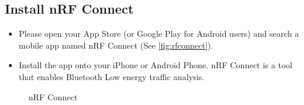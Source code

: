 \documentclass[11pt]{article}
\begin{document}
\begin{enumerate}
\subsection{Install \textsf{nRF Connect}}
\begin{itemize}
\item  Please open your App Store (or Google Play for Android users) and search a mobile app named \textsf{nRF Connect} (See \autoref{fig:rfconnect}). 
\item Install the app onto your iPhone or Android Phone. \textsf{nRF Connect} is a tool that enables Bluetooth Low energy traffic analysis.  
\end{itemize}

 \begin{figure}[h]
\centering
{}
\caption{nRF Connect}\label{fig:rfconnect}
\end{figure}

  
\end{enumerate}
\end{document}
